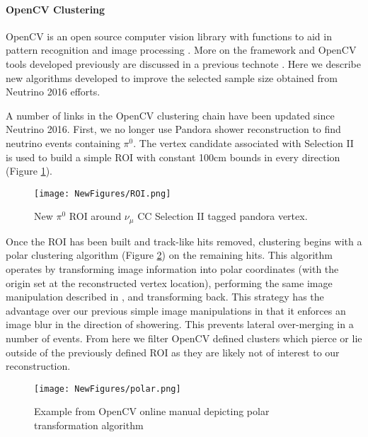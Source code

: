 \documentclass[12pt]{article}
\begin{document}
\paragraph{OpenCV Clustering}
OpenCV is an open source computer vision library with functions to aid in pattern recognition and image processing \cite{bib:opencv}. More on the framework and OpenCV tools developed previously are discussed in a previous technote \cite{bib:5856}. Here we describe new algorithms developed to improve the selected sample size obtained from Neutrino 2016 efforts\cite{bib:5864}.
\par A number of links in the OpenCV clustering chain have been updated since Neutrino 2016. First, we no longer use Pandora shower reconstruction to find neutrino events containing $\pi^0$. The vertex candidate associated with Selection II is used to build a simple ROI with constant 100cm bounds in every direction (Figure \ref{fig:roi}). 

\begin{figure}[h!]
\centering
\texttt{[image: NewFigures/ROI.png]}
\caption{New $\pi^0$ ROI around $\nu_\mu$ CC Selection II tagged pandora vertex. }
\label{fig:roi}
\end{figure}

\par Once the ROI has been built and track-like hits removed, clustering begins with a polar clustering algorithm (Figure \ref{fig:polar}) on the remaining hits. This algorithm operates by transforming image information into polar coordinates (with the origin set at the reconstructed vertex location), performing the same image manipulation described in \cite{bib:5856}, and transforming back. This strategy has the advantage over our previous simple image manipulations in that it enforces an image blur in the direction of showering. This prevents lateral over-merging in a number of events. From here we filter OpenCV defined clusters which pierce or lie outside of the previously defined ROI as they are likely not of interest to our reconstruction. 

\begin{figure}[h!]
\centering
\texttt{[image: NewFigures/polar.png]}
\caption{ Example from OpenCV online manual depicting polar transformation algorithm }
\label{fig:polar}
\end{figure}
\end{document}
